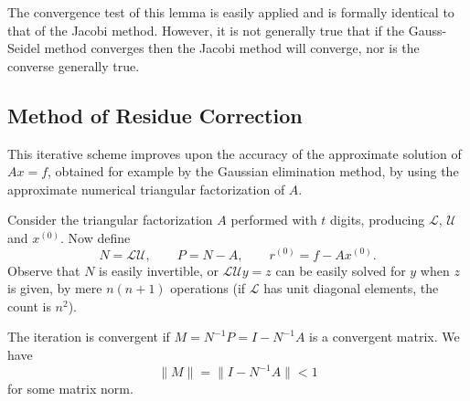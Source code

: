 \documentclass[../main.tex]{subfiles}
\begin{document}
The convergence test of this lemma is easily applied and is formally identical to that of the Jacobi method. However, it is not generally true that if the Gauss-Seidel method converges then the Jacobi method will converge, nor is the converse generally true.

\subsection{Method of Residue Correction}
This iterative scheme improves upon the accuracy of the approximate
solution of $Ax = f$, obtained for example by the Gaussian elimination method, by using the approximate numerical triangular factorization of $A$.

Consider the triangular factorization $A$ performed with $t$ digits, producing $\mathcal{L}$, $\mathcal{U}$ and $x^{(0)}$. Now define
\begin{equation}
	N = \mathcal{L} \mathcal{U}, \qquad P = N - A, \qquad r^{(0)} = f - A x^{(0)}.
\end{equation}
Observe that $N$ is easily invertible, or $\mathcal{L}\mathcal{U} y = z$ can be easily solved for $y$ when $z$ is given, by mere $n(n+1)$ operations (if $\mathcal{L}$ has unit diagonal elements, the count is $n^2$).

The iteration is convergent if $M = N^{-1} P = I - N^{-1} A$ is a convergent matrix. We have
\begin{equation*}
	\| M \| = \| I - N^{-1} A \| < 1
\end{equation*}
for some matrix norm.
\end{document}
